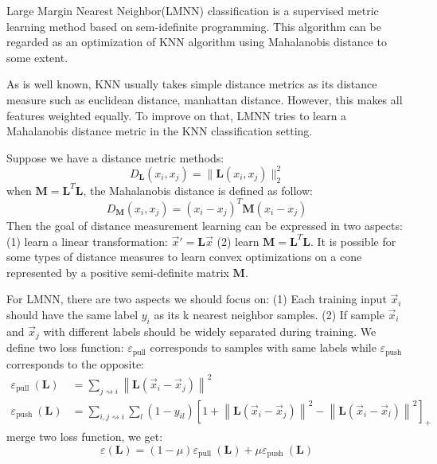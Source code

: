     Large Margin Nearest Neighbor(LMNN)\cite{LMNN} classification is a supervised metric learning method based on sem-idefinite programming. This algorithm can be regarded as an optimization of KNN algorithm using Mahalanobis distance to some extent. 
    
    As is well known, KNN usually takes simple distance metrics as its distance measure such as euclidean distance, manhattan distance. However, this makes all features weighted equally. To improve on that, LMNN tries to learn a Mahalanobis distance metric in the KNN classification setting.
    
     Suppose we have a distance metric methods:
     $$
        D_{\mathbf{L}}(x_i, x_j) = \|\mathbf{L}(x_i, x_j)\|_2^2
     $$
    when $\mathbf{M} = \mathbf{L}^T \mathbf{L}$, the Mahalanobis distance is defined as follow:
    $$
        D_{\mathbf{M}}(x_i, x_j) = (x_i - x_j)^T \mathbf{M} (x_i - x_j)
    $$
    Then the goal of distance measurement learning can be expressed in two aspects:
    (1) learn a linear transformation: $ \vec{x}' = \mathbf{L} \vec{x}$ (2) learn $\mathbf{M} = \mathbf{L}^T \mathbf{L}$. It is possible for some types of distance measures to learn convex optimizations on a cone represented by a positive semi-definite matrix $\mathbf{M}$.
    
    For LMNN, there are two aspects we should focus on: (1) Each training input $\vec{x}_i$ should have the same label $y_i$ as its k nearest neighbor samples. (2) If sample $\vec{x}_i$ and $\vec{x}_j$ with different labels should be widely separated during training.
    We define two loss function: $\varepsilon_{\text{pull}}$ corresponds to samples with same labels while $\varepsilon_{\text{push}}$ corresponds to the opposite:
    $$
    \begin{aligned}
       \varepsilon_{\text {pull }}(\mathbf{L}) &= \sum_{j \rightsquigarrow i}\left\|\mathbf{L}\left(\vec{x}_{i}-\vec{x}_{j}\right)\right\|^{2} \\
       \varepsilon_{\text {push }}(\mathbf{L}) &= \sum_{i, j \rightsquigarrow i} \sum_{l}\left(1-y_{i l}\right)\left[1+\left\|\mathbf{L}\left(\vec{x}_{i}-\vec{x}_{j}\right)\right\|^{2}-\left\|\mathbf{L}\left(\vec{x}_{i}-\vec{x}_{l}\right)\right\|^{2}\right]_{+}
    \end{aligned}
    $$
    merge two loss function, we get:
    $$
        \varepsilon(\mathbf{L}) = (1-\mu) \varepsilon_{\text {pull }}(\mathbf{L})+\mu \varepsilon_{\text {push }}(\mathbf{L})
    $$
    
